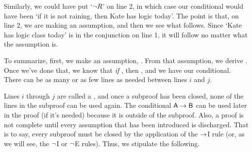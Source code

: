 Similarly, we could have put `${\neg} R$' on line 2, in which case our conditional would have been `if it is not raining, then Kate has logic today'. The point is that, on line 2, we are making an assumption, and then we see what follows. Since `Kate has logic class today' is in the conjunction on line 1, it will follow no matter what the assumption is.

To summarize, first, we make an assumption, . From that assumption, we derive . Once we've done that, we know that \textit{if} , then , and we have our conditional. 
\noindent There can be as many or as few lines as needed between lines $i$ and $j$. 

Lines $i$ through $j$ are called a , and once a subproof has been closed, none of the lines in the subproof can be used again. The conditional $\mathsf{A}\rightarrow\mathsf{B}$ can be used later in the proof (if it's needed) because it is outside of the subproof. Also, a proof is not complete until every assumption that has been introduced is discharged. That is to say, every subproof must be closed by the application of the $\rightarrow$I rule (or, as we will see, the ${\neg}$I or ${\neg}$E rules).
Thus, we stipulate the following.


